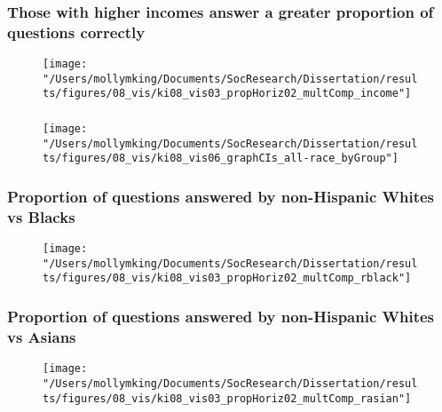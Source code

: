 \documentclass[pdf]{beamer}
\begin{document}
\begin{frame}
\frametitle{Those with higher incomes answer a greater proportion of questions correctly}
  \begin{figure}[ht]
    \begin{center}
    \texttt{[image: "/Users/mollymking/Documents/SocResearch/Dissertation/results/figures/08\_vis/ki08\_vis03\_propHoriz02\_multComp\_income"]}
    \end{center}
  \end{figure}

\end{frame}


\begin{frame}
\frametitle{}
  \begin{figure}[ht]
    \begin{center}
    \texttt{[image: "/Users/mollymking/Documents/SocResearch/Dissertation/results/figures/08\_vis/ki08\_vis06\_graphCIs\_all-race\_byGroup"]}
    \end{center}
  \end{figure}
\end{frame}

\begin{frame}
\frametitle{Proportion of questions answered by non-Hispanic Whites vs Blacks}
  \begin{figure}[ht]
    \begin{center}
    \texttt{[image: "/Users/mollymking/Documents/SocResearch/Dissertation/results/figures/08\_vis/ki08\_vis03\_propHoriz02\_multComp\_rblack"]}
    \end{center}
  \end{figure}
\end{frame}


\begin{frame}
\frametitle{Proportion of questions answered by non-Hispanic Whites vs Asians}
  \begin{figure}[ht]
    \begin{center}
    \texttt{[image: "/Users/mollymking/Documents/SocResearch/Dissertation/results/figures/08\_vis/ki08\_vis03\_propHoriz02\_multComp\_rasian"]}
    \end{center}
  \end{figure}
\end{frame}
\end{document}

